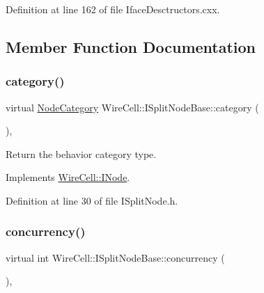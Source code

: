 Definition at line 162 of file Iface\+Desctructors.\+cxx.



\subsection{Member Function Documentation}
\mbox{\label{class_wire_cell_1_1_i_split_node_base_aae628151ca5604b24682381ba267dded}} 
\subsubsection{\texorpdfstring{category()}{category()}}
{\footnotesize\ttfamily virtual \hyperlink{class_wire_cell_1_1_i_node_a5546e64cbb70bd3ac787295cac9ac803}{Node\+Category} Wire\+Cell\+::\+I\+Split\+Node\+Base\+::category (\begin{DoxyParamCaption}{ }\end{DoxyParamCaption})\hspace{0.3cm}{\ttfamily [inline]}, {\ttfamily [virtual]}}



Return the behavior category type. 



Implements \hyperlink{class_wire_cell_1_1_i_node_a58c07f15b165e5fb33bbc7b2e047b39b}{Wire\+Cell\+::\+I\+Node}.



Definition at line 30 of file I\+Split\+Node.\+h.

\mbox{\label{class_wire_cell_1_1_i_split_node_base_a001e95f0334b6f626049a7d50f6cf55f}} 
\subsubsection{\texorpdfstring{concurrency()}{concurrency()}}
{\footnotesize\ttfamily virtual int Wire\+Cell\+::\+I\+Split\+Node\+Base\+::concurrency (\begin{DoxyParamCaption}{ }\end{DoxyParamCaption})\hspace{0.3cm}{\ttfamily [inline]}, {\ttfamily [virtual]}}



